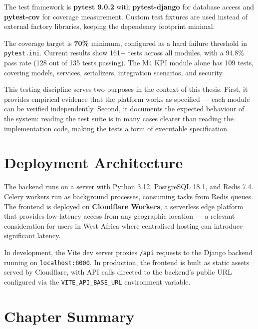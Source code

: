 \noindent
The test framework is \textbf{pytest 9.0.2}
with \textbf{pytest-django} for database access
and \textbf{pytest-cov} for coverage measurement.
Custom test fixtures are used instead of
external factory libraries,
keeping the dependency footprint minimal.

\vspace{0.4cm}
\noindent
The coverage target is \textbf{70\%} minimum,
configured as a hard failure threshold
in \texttt{pytest.ini}.
Current results show 161+ tests across all modules,
with a 94.8\% pass rate (128 out of 135 tests passing).
The M4 KPI module alone has 109 tests,
covering models, services, serializers,
integration scenarios, and security.

\vspace{0.4cm}
\noindent
This testing discipline serves two purposes
in the context of this thesis.
First, it provides empirical evidence
that the platform works as specified —
each module can be verified independently.
Second, it documents the expected behaviour
of the system: reading the test suite
is in many cases clearer than reading
the implementation code,
making the tests a form of executable specification.


\section{Deployment Architecture}

\noindent
The backend runs on a server with Python 3.12,
PostgreSQL 18.1, and Redis 7.4.
Celery workers run as background processes,
consuming tasks from Redis queues.
The frontend is deployed on \textbf{Cloudflare Workers},
a serverless edge platform that provides
low-latency access from any geographic location —
a relevant consideration for users
in West Africa where centralised hosting
can introduce significant latency.

\vspace{0.4cm}
\noindent
In development, the Vite dev server proxies
\texttt{/api} requests to the Django backend
running on \texttt{localhost:8000}.
In production, the frontend is built as static assets
served by Cloudflare, with API calls directed
to the backend's public URL
configured via the \texttt{VITE\_API\_BASE\_URL}
environment variable.


\section{Chapter Summary}

